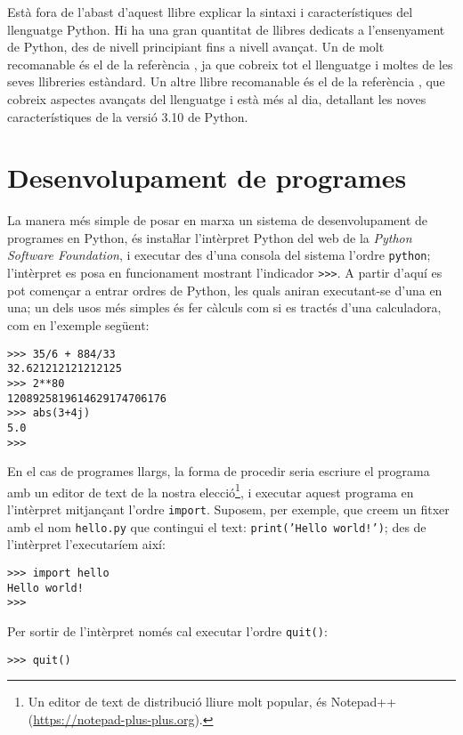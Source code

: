 Està fora de l'abast d'aquest llibre explicar la sintaxi i característiques del llenguatge Python. Hi ha una gran quantitat de llibres dedicats a l'ensenyament de Python, des de nivell principiant fins a nivell avançat. Un de molt recomanable és el de la referència \cite{SUM}, ja que cobreix tot el llenguatge i moltes de les seves llibreries estàndard. Un altre llibre recomanable és el de la referència \cite{RAM}, que cobreix aspectes avançats del llenguatge i està més al dia, detallant les noves característiques de la versió 3.10 de Python.


\section{Desenvolupament de programes}\label{sec:py-desenvel-prog}

La manera més simple de posar en marxa un sistema de desenvolupament de programes en Python, és instaŀlar l'intèrpret Python del web de la \textit{Python Software Foundation}, i executar des d'una consola del sistema l'ordre \texttt{python};
l'intèrpret es posa en funcionament mostrant l'indicador \texttt{>{}>{}>}. A partir d'aquí es pot començar a entrar ordres de Python, les quals aniran executant-se d'una en una; un dels usos més simples és  fer càlculs com si es tractés d'una calculadora, com en l'exemple següent:
\begin{lstlisting}
>>> 35/6 + 884/33
32.621212121212125
>>> 2**80
1208925819614629174706176
>>> abs(3+4j)
5.0
>>>
\end{lstlisting}

En el cas de programes llargs, la forma de procedir seria escriure el programa amb un editor de text de la nostra elecció\footnote{Un editor de text de distribució lliure molt popular, és Notepad++ (\href{https://notepad-plus-plus.org/}{https://notepad-plus-plus.org}).}, i executar aquest programa en l'intèrpret mitjançant l'ordre \texttt{import}. Suposem, per exemple, que creem un fitxer amb el nom \texttt{hello.py} que contingui el text: \texttt{print('Hello world!')}; des de l'intèrpret l'executaríem així:
\begin{lstlisting}
>>> import hello
Hello world!
>>>
\end{lstlisting}

Per sortir de l'intèrpret només cal executar l'ordre \texttt{quit()}:
\begin{lstlisting}
>>> quit()
\end{lstlisting}


